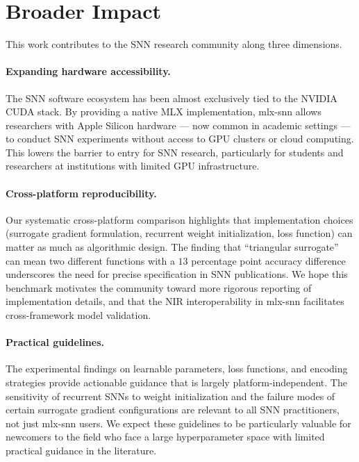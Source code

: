 \documentclass[11pt]{article}
\begin{document}
\section{Broader Impact}

This work contributes to the SNN research community along three dimensions.

\paragraph{Expanding hardware accessibility.}
The SNN software ecosystem has been almost exclusively tied to the NVIDIA CUDA stack. By providing a native MLX implementation, mlx-snn allows researchers with Apple Silicon hardware --- now common in academic settings --- to conduct SNN experiments without access to GPU clusters or cloud computing. This lowers the barrier to entry for SNN research, particularly for students and researchers at institutions with limited GPU infrastructure.

\paragraph{Cross-platform reproducibility.}
Our systematic cross-platform comparison highlights that implementation choices (surrogate gradient formulation, recurrent weight initialization, loss function) can matter as much as algorithmic design. The finding that ``triangular surrogate'' can mean two different functions with a $13$ percentage point accuracy difference underscores the need for precise specification in SNN publications. We hope this benchmark motivates the community toward more rigorous reporting of implementation details, and that the NIR interoperability in mlx-snn facilitates cross-framework model validation.

\paragraph{Practical guidelines.}
The experimental findings on learnable parameters, loss functions, and encoding strategies provide actionable guidance that is largely platform-independent. The sensitivity of recurrent SNNs to weight initialization and the failure modes of certain surrogate gradient configurations are relevant to all SNN practitioners, not just mlx-snn users. We expect these guidelines to be particularly valuable for newcomers to the field who face a large hyperparameter space with limited practical guidance in the literature.
\end{document}
